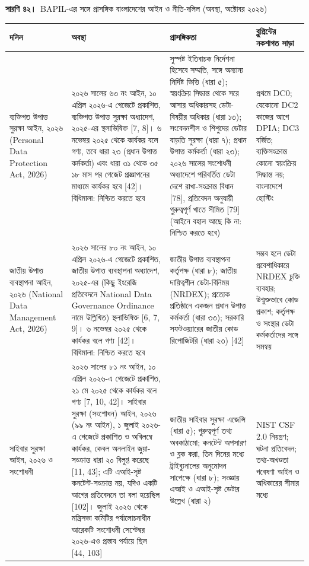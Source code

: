\documentclass[border=10pt]{standalone}
\begin{document}
\begin{minipage}{17cm}
{\large\bfseries সারণি ৪২।}\ {\large BAPIL-এর সঙ্গে প্রাসঙ্গিক বাংলাদেশের আইন ও নীতি-দলিল (অবস্থা, অক্টোবর ২০২৬)}\par\vspace{7pt}
\small
{}
\begin{tabularx}{\linewidth}{@{}>{\hsize=0.735\hsize\raggedright\arraybackslash}X>{\hsize=1.347\hsize\raggedright\arraybackslash}X>{\hsize=1.020\hsize\raggedright\arraybackslash}X>{\hsize=0.898\hsize\raggedright\arraybackslash}X@{}}
\arrayrulecolor{bapilrule}\toprule
\rowcolor{white}\textbf{দলিল} & \textbf{অবস্থা} & \textbf{প্রাসঙ্গিকতা} & \textbf{ব্লুপ্রিন্টের নকশাগত সাড়া} \\
\midrule
ব্যক্তিগত উপাত্ত সুরক্ষা আইন, ২০২৬ (Personal Data Protection Act, 2026) & ২০২৬ সালের ৬৩ নং আইন, ১০ এপ্রিল ২০২৬-এ গেজেটে প্রকাশিত, ব্যক্তিগত উপাত্ত সুরক্ষা অধ্যাদেশ, ২০২৫-এর স্থলাভিষিক্ত [7, 8]। ৬ নভেম্বর ২০২৫ থেকে কার্যকর বলে গণ্য, তবে ধারা ২৩ (প্রধান উপাত্ত কর্মকর্তা) এবং ধারা ৩১ থেকে ৩৫ ১৮ মাস পর গেজেট প্রজ্ঞাপনের মাধ্যমে কার্যকর হবে [42]। বিধিমালা: নিশ্চিত করতে হবে & সুস্পষ্ট ইতিবাচক নির্দেশনা হিসেবে সম্মতি, সঙ্গে অন্যান্য নির্দিষ্ট ভিত্তি (ধারা ৫); স্বয়ংক্রিয় সিদ্ধান্ত থেকে সরে আসার অধিকারসহ ডেটা-বিষয়ীর অধিকার (ধারা ১৩); সংবেদনশীল ও শিশুদের ডেটার বাড়তি সুরক্ষা (ধারা ৭); প্রধান উপাত্ত কর্মকর্তা (ধারা ২৩); ২০২৬ সালের সংশোধনী অধ্যাদেশে পরিবর্তিত ডেটা দেশে রাখা-সংক্রান্ত বিধান [78], প্রতিবেদন অনুযায়ী গুরুত্বপূর্ণ খাতে সীমিত [79] (আইনে বহাল আছে কি না: নিশ্চিত করতে হবে) & প্রথমে DC0; যেকোনো DC2 কাজের আগে DPIA; DC3 বর্জিত; ব্যক্তিসংক্রান্ত কোনো স্বয়ংক্রিয় সিদ্ধান্ত নয়; বাংলাদেশে হোস্টিং \\
জাতীয় উপাত্ত ব্যবস্থাপনা আইন, ২০২৬ (National Data Management Act, 2026) & ২০২৬ সালের ৮০ নং আইন, ১০ এপ্রিল ২০২৬-এ গেজেটে প্রকাশিত, জাতীয় উপাত্ত ব্যবস্থাপনা অধ্যাদেশ, ২০২৫-এর (কিছু ইংরেজি প্রতিবেদনে National Data Governance Ordinance নামে উল্লিখিত) স্থলাভিষিক্ত [6, 7, 9]। ৬ নভেম্বর ২০২৫ থেকে কার্যকর বলে গণ্য [42]। বিধিমালা: নিশ্চিত করতে হবে & জাতীয় উপাত্ত ব্যবস্থাপনা কর্তৃপক্ষ (ধারা ৮); জাতীয় দায়িত্বশীল ডেটা-বিনিময় (NRDEX); প্রত্যেক প্রতিষ্ঠানে একজন প্রধান উপাত্ত কর্মকর্তা (ধারা ৩৩); সরকারি সফটওয়্যারের জাতীয় কোড রিপোজিটরি (ধারা ২৩) [42] & সম্ভব হলে ডেটা প্রবেশাধিকারে NRDEX চুক্তি ব্যবহার; উন্মুক্তভাবে কোড প্রকাশ; কর্তৃপক্ষ ও সংস্থার ডেটা কর্মকর্তাদের সঙ্গে সমন্বয় \\
সাইবার সুরক্ষা আইন, ২০২৬ ও সংশোধনী & ২০২৬ সালের ৮১ নং আইন, ১০ এপ্রিল ২০২৬-এ গেজেটে প্রকাশিত, ২১ মে ২০২৫ থেকে কার্যকর বলে গণ্য [7, 10, 42]। সাইবার সুরক্ষা (সংশোধন) আইন, ২০২৬ (৯৯ নং আইন), ১ জুলাই ২০২৬-এ গেজেটে প্রকাশিত ও অবিলম্বে কার্যকর, কেবল অনলাইন জুয়া-সংক্রান্ত ধারা ২০ বিলুপ্ত করেছে [11, 43]; এটি এআই-সৃষ্ট কনটেন্ট-সংক্রান্ত নয়, যদিও একটি আগের প্রতিবেদনে তা বলা হয়েছিল [102]। জুলাই ২০২৬ থেকে মন্ত্রিসভা কমিটির পর্যালোচনাধীন আরেকটি সংশোধনী সেপ্টেম্বর ২০২৬-এও প্রস্তাব পর্যায়ে ছিল [44, 103] & জাতীয় সাইবার সুরক্ষা এজেন্সি (ধারা ৫); গুরুত্বপূর্ণ তথ্য অবকাঠামো; কনটেন্ট অপসারণ ও ব্লক করা, তিন দিনের মধ্যে ট্রাইব্যুনালের অনুমোদন সাপেক্ষে (ধারা ৮); সংজ্ঞায় এআই ও এআই-সৃষ্ট ডেটার উল্লেখ (ধারা ২) & NIST CSF 2.0 নিয়ন্ত্রণ; ঘটনা প্রতিবেদন; তথ্য-অখণ্ডতা গবেষণা আইন ও অধিকারের সীমার মধ্যে \\

\end{tabularx}
\end{minipage}
\end{document}
